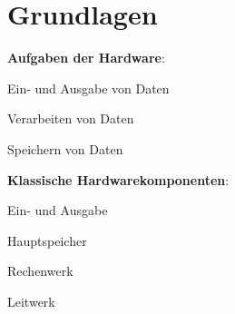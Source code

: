 \section{Grundlagen}
\label{sec:grundlagen}
  \textbf{Aufgaben der Hardware}:
  \begin{items}
    \item Ein- und Ausgabe von Daten
    \item Verarbeiten von Daten
    \item Speichern von Daten
  \end{items}

  \textbf{Klassische Hardwarekomponenten}:
  \begin{items}
    \item Ein- und Ausgabe
    \item Hauptspeicher
    \item Rechenwerk
    \item Leitwerk
  \end{items}